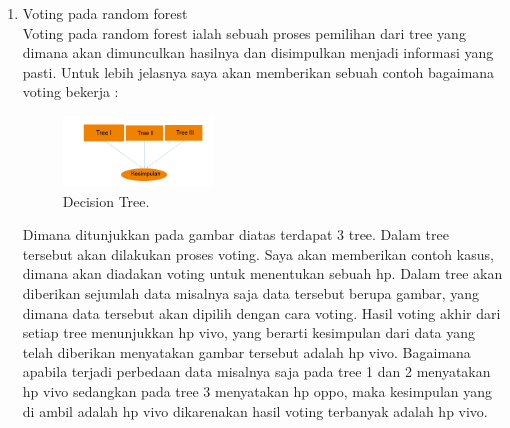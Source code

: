 \begin{enumerate}
\item Voting pada random forest \\
Voting pada random forest ialah sebuah proses pemilihan dari tree yang dimana akan dimunculkan hasilnya dan disimpulkan menjadi informasi yang pasti. Untuk lebih jelasnya saya akan memberikan sebuah contoh bagaimana voting bekerja : 
	\begin{figure}[H]
	\centering
		\includegraphics[width=4cm]{figures/1174054/3/3.png}
		\caption{Decision Tree.}
	\end{figure}
Dimana ditunjukkan pada gambar diatas terdapat 3 tree. Dalam tree tersebut akan dilakukan proses voting. Saya akan memberikan contoh kasus, dimana akan diadakan voting untuk menentukan sebuah hp. Dalam tree akan diberikan sejumlah data misalnya saja data tersebut berupa gambar, yang dimana data tersebut akan dipilih dengan cara voting. Hasil voting akhir dari setiap tree menunjukkan hp vivo, yang berarti kesimpulan dari data yang telah diberikan menyatakan gambar tersebut adalah hp vivo. Bagaimana apabila terjadi perbedaan data misalnya saja pada tree 1 dan 2 menyatakan hp vivo sedangkan pada tree 3 menyatakan hp oppo, maka kesimpulan yang di ambil adalah hp vivo dikarenakan hasil voting terbanyak adalah hp vivo.
\end{enumerate}

